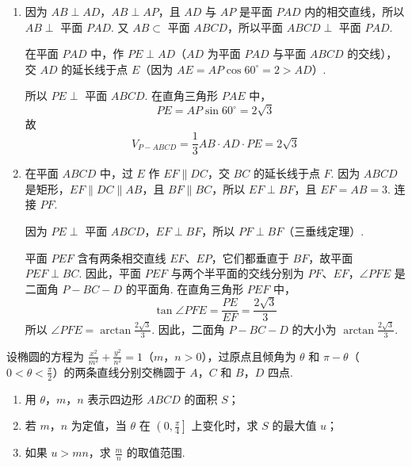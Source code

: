\documentclass[UTF8,a4paper,oneside,11pt]{ctexbook}
\begin{document}
\begin{solution}
\begin{enumerate}
\item 因为 \(AB\perp AD\)，\(AB\perp AP\)，且 \(AD\) 与 \(AP\) 是平面 \(PAD\) 内的相交直线，所以 \(AB\perp\) 平面 \(PAD\). 又 \(AB\subset\) 平面 \(ABCD\)，所以平面 \(ABCD\perp\) 平面 \(PAD\).

在平面 \(PAD\) 中，作 \(PE\perp AD\)（\(AD\) 为平面 \(PAD\) 与平面 \(ABCD\) 的交线），交 \(AD\) 的延长线于点 \(E\)（因为 \(AE=AP\cos60^\circ=2>AD\)）.

所以 \(PE\perp\) 平面 \(ABCD\). 在直角三角形 \(PAE\) 中，
\[
PE=AP\sin60^\circ=2\sqrt{3}
\]
故
\[
V_{P-ABCD}=\frac{1}{3}AB\cdot AD\cdot PE=2\sqrt{3}
\]

\item 在平面 \(ABCD\) 中，过 \(E\) 作 \(EF\parallel DC\)，交 \(BC\) 的延长线于点 \(F\). 因为 \(ABCD\) 是矩形，\(EF\parallel DC\parallel AB\)，且 \(BF\parallel BC\)，所以 \(EF\perp BF\)，且 \(EF=AB=3\). 连接 \(PF\).

因为 \(PE\perp\) 平面 \(ABCD\)，\(EF\perp BF\)，所以 \(PF\perp BF\)（三垂线定理）.

平面 \(PEF\) 含有两条相交直线 \(EF\)、\(EP\)，它们都垂直于 \(BF\)，故平面 \(PEF\perp BC\). 因此，平面 \(PEF\) 与两个半平面的交线分别为 \(PF\)、\(EF\)，\(\angle PFE\) 是二面角 \(P-BC-D\) 的平面角. 在直角三角形 \(PEF\) 中，
\[
\tan\angle PFE=\frac{PE}{EF}=\frac{2\sqrt{3}}{3}
\]
所以 \(\angle PFE=\arctan\frac{2\sqrt{3}}{3}\). 因此，二面角 \(P-BC-D\) 的大小为 \(\arctan\frac{2\sqrt{3}}{3}\).
\end{enumerate}
\end{solution}

\begin{problem}
设椭圆的方程为 \(\frac{x^2}{m^2}+\frac{y^2}{n^2}=1\)（\(m\)，\(n>0\)），过原点且倾角为 \(\theta\) 和 \(\pi-\theta\)（\(0<\theta<\frac{\pi}{2}\)）的两条直线分别交椭圆于 \(A\)，\(C\) 和 \(B\)，\(D\) 四点.

\begin{enumerate}
\item 用 \(\theta\)，\(m\)，\(n\) 表示四边形 \(ABCD\) 的面积 \(S\)；
\item 若 \(m\)，\(n\) 为定值，当 \(\theta\) 在 \(\left(0,\frac{\pi}{4}\right]\) 上变化时，求 \(S\) 的最大值 \(u\)；
\item 如果 \(u>mn\)，求 \(\frac{m}{n}\) 的取值范围.
\end{enumerate}
\end{problem}
\end{document}
